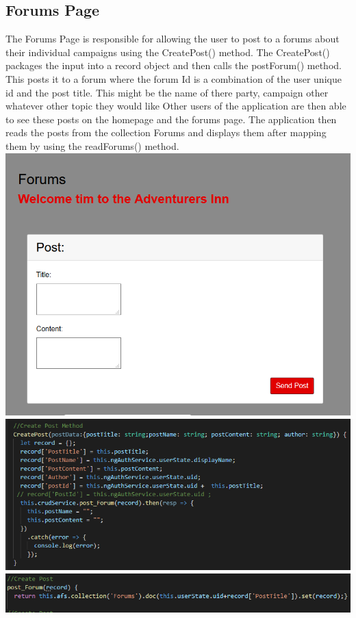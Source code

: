 \subsection{Forums Page}
The Forums Page is responsible for allowing the user to post to a forums about their individual campaigns using the  CreatePost() method. The  CreatePost() packages the input into a record object and then calls the postForum() method. This posts it to a forum where the forum Id is a combination of the user unique id and the post title. This might be the name of there party, campaign other whatever other topic they would like Other users of the application are then able to see these posts on the homepage and the forums page. The application then reads the posts from the collection Forums and displays them after mapping them by using the readForums() method.\\
\includegraphics[scale=0.3]{./img/ForumInput.PNG} 
\includegraphics[scale=0.3]{./img/CreatePost.PNG}
\includegraphics[scale=0.3]{./img/PostForum.PNG}
